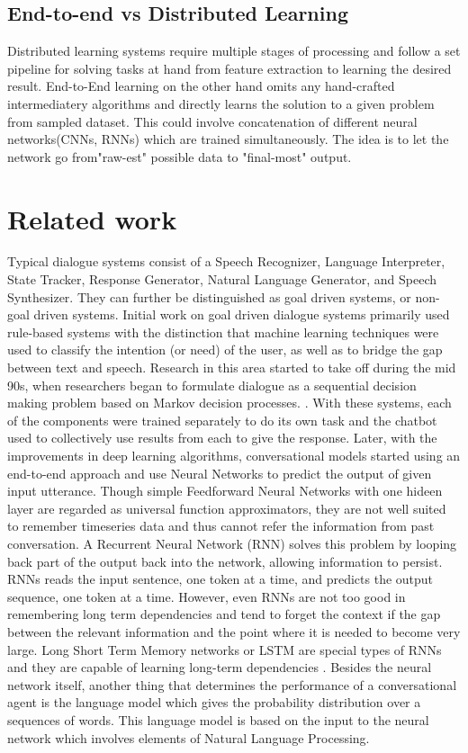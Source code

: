 \documentclass[letterpaper] {article} %
\begin{document}
\subsection{End-to-end vs Distributed Learning}
Distributed learning systems require multiple stages of processing and follow a set pipeline for solving tasks at hand from feature extraction to learning the desired result. End-to-End learning on the other hand omits any hand-crafted intermediatery algorithms and directly learns the solution to a given problem from sampled dataset. This could involve concatenation of different neural networks(CNNs, RNNs) which are trained simultaneously. The idea is to let the network go from"raw-est" possible data to "final-most" output.

\section{Related work}
Typical dialogue systems consist of a Speech Recognizer, Language Interpreter, State Tracker, Response Generator, Natural Language Generator, and Speech Synthesizer. They can further be distinguished as goal driven systems, or non-goal driven systems. Initial work on goal driven dialogue systems primarily used rule-based systems with the distinction that machine learning techniques were used to classify the intention (or need) of the user, as well as to bridge the gap between text and speech\cite{serban2015survey}. Research in this area started to take off during the mid 90s, when researchers began to formulate dialogue as a sequential decision making problem based on Markov decision processes. \cite{young2013pomdp} \cite{singh2000reinforcement} \cite{pieraccini2009we}. With these systems, each of the components were trained separately to do its own task and the chatbot used to collectively use results from each to give the response. Later, with the improvements in deep learning algorithms, conversational models started using an end-to-end approach and use Neural Networks to predict the output of given input utterance. Though simple Feedforward Neural Networks with one hideen layer are regarded as universal function approximators, they are not well suited to remember timeseries data and thus cannot refer the information from past conversation. A Recurrent Neural Network (RNN) solves this problem by looping back part of the output back into the network, allowing information to persist. RNNs reads the input sentence, one token at a time, and predicts the output sequence, one token at a time. However, even RNNs are not too good in remembering long term dependencies and tend to forget the context if the gap between the relevant information and the point where it is needed to become very large. Long Short Term Memory networks or LSTM are special types of RNNs and they are capable of learning long-term dependencies \cite{Hochreiter:1997:LSM:1246443.1246450}. Besides the neural network itself, another thing that determines the performance of a conversational agent is the language model which gives the probability distribution over a sequences of words. This language model is based on the input to the neural network which involves elements of Natural Language Processing.\\\\
\end{document}
